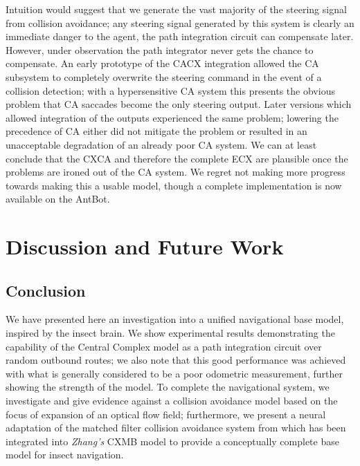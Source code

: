 \documentclass[a4paper,11pt,twoside,openright]{article}
\let\oldsection\section
\def\section{\cleardoublepage\oldsection}
\begin{document}
Intuition would suggest that we generate the vast majority of the
steering signal from collision avoidance; any steering signal
generated by this system is clearly an immediate danger to the agent,
the path integration circuit can compensate later. However, under
observation the path integrator never gets the chance to
compensate. An early prototype of the CACX integration allowed the CA
subsystem to completely overwrite the steering command in the event of
a collision detection; with a hypersensitive CA system this presents
the obvious problem that CA saccades become the only steering output.
Later versions which allowed integration of the outputs experienced
the same problem; lowering the precedence of CA either did not
mitigate the problem or resulted in an unacceptable degradation of an
already poor CA system. We can at least conclude that the CXCA and
therefore the complete ECX are plausible once the problems are ironed
out of the CA system. We regret not making more progress towards
making this a usable model, though a complete implementation is now
available on the AntBot.
\newpage


\section{ Discussion and Future Work}
\subsection{Conclusion}
We have presented here an investigation into a unified navigational
base model, inspired by the insect brain. We show experimental results
demonstrating the capability of the Central Complex model as a path
integration circuit over random outbound routes; we also note that
this good performance was achieved with what is generally considered
to be a poor odometric measurement, further showing the strength of
the model. To complete the navigational system, we investigate and
give evidence against a collision avoidance model based on the focus
of expansion of an optical flow field; furthermore, we present a
neural adaptation of the matched filter collision avoidance system
from \cite{Mitchell2018} which has been integrated into
\textit{Zhang's} CXMB model to provide a conceptually complete base
model for insect navigation.
\end{document}
